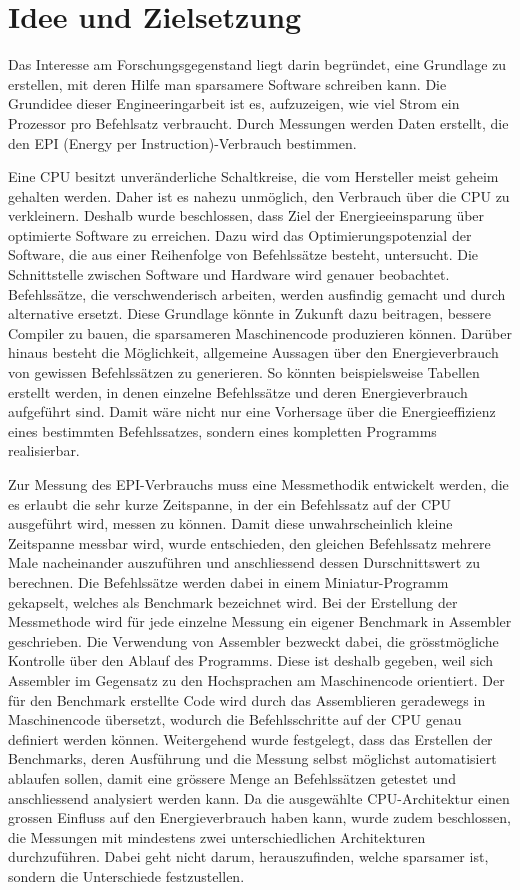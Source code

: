 \chapter{Idee und Zielsetzung}



Das Interesse am Forschungsgegenstand liegt darin begründet, eine Grundlage zu erstellen, mit deren Hilfe man sparsamere Software schreiben kann. Die Grundidee dieser Engineeringarbeit ist es, aufzuzeigen, wie viel Strom ein Prozessor pro Befehlsatz verbraucht. Durch Messungen werden Daten erstellt, die den EPI (Energy per Instruction)-Verbrauch bestimmen.
\par 
Eine CPU besitzt unveränderliche Schaltkreise, die vom Hersteller meist geheim gehalten werden. Daher ist es nahezu unmöglich, den Verbrauch über die CPU zu verkleinern. Deshalb wurde beschlossen, dass Ziel der Energieeinsparung über optimierte Software zu erreichen. Dazu wird das Optimierungspotenzial der Software, die aus einer Reihenfolge von Befehlssätze besteht, untersucht. Die Schnittstelle zwischen Software und Hardware wird genauer beobachtet. Befehlssätze, die verschwenderisch arbeiten, werden ausfindig gemacht und durch alternative ersetzt. Diese Grundlage könnte in Zukunft dazu beitragen, bessere Compiler zu bauen, die sparsameren Maschinencode produzieren können. Darüber hinaus besteht die Möglichkeit, allgemeine Aussagen über den Energieverbrauch von gewissen Befehlssätzen zu generieren. So könnten beispielsweise Tabellen erstellt werden, in denen einzelne Befehlssätze und deren Energieverbrauch aufgeführt sind. Damit wäre nicht nur eine Vorhersage über die Energieeffizienz eines bestimmten Befehlssatzes, sondern eines kompletten Programms realisierbar.  
\par
Zur Messung des EPI-Verbrauchs muss eine Messmethodik entwickelt werden, die es erlaubt die sehr kurze Zeitspanne, in der ein Befehlssatz auf der CPU ausgeführt wird, messen zu können. Damit diese unwahrscheinlich kleine Zeitspanne messbar wird, wurde entschieden, den gleichen Befehlssatz mehrere Male nacheinander auszuführen und anschliessend dessen Durschnittswert zu berechnen. Die Befehlssätze werden dabei in einem Miniatur-Programm gekapselt, welches als Benchmark bezeichnet wird. Bei der Erstellung der Messmethode wird für jede einzelne Messung ein eigener Benchmark in Assembler geschrieben. Die Verwendung von Assembler bezweckt dabei, die grösstmögliche Kontrolle über den Ablauf des Programms. Diese ist deshalb gegeben, weil sich Assembler im Gegensatz zu den Hochsprachen am Maschinencode orientiert. Der für den Benchmark erstellte Code wird durch das Assemblieren geradewegs in Maschinencode übersetzt, wodurch die Befehlsschritte auf der CPU genau definiert werden können. Weitergehend wurde festgelegt, dass das Erstellen der Benchmarks, deren Ausführung und die Messung selbst möglichst automatisiert ablaufen sollen, damit eine grössere Menge an Befehlssätzen getestet und anschliessend analysiert werden kann. Da die ausgewählte CPU-Architektur einen grossen Einfluss auf den Energieverbrauch haben kann, wurde zudem beschlossen, die Messungen mit mindestens zwei unterschiedlichen Architekturen durchzuführen. Dabei geht nicht darum, herauszufinden, welche sparsamer ist, sondern die Unterschiede festzustellen. 

